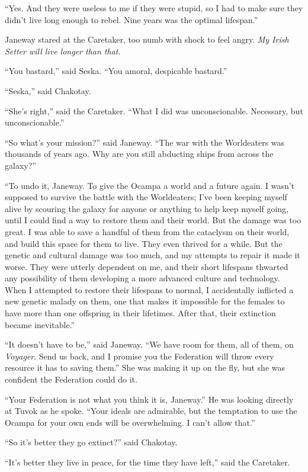 \documentclass[twoside,letterpaper,12pt]{memoir}
\begin{document}
``Yes. And they were useless to me if they were stupid, so I had to make sure they didn’t live long enough to rebel. Nine years was the optimal lifespan.” 

Janeway stared at the Caretaker, too numb with shock to feel angry. \textit{My Irish Setter will live longer than that}. 

``You bastard,” said Seska. ``You amoral, despicable bastard.” 

``Seska,” said Chakotay. 

``She’s right,” said the Caretaker. ``What I did was unconscionable. Necessary, but unconscionable.” 

``So what’s your mission?” said Janeway. ``The war with the Worldeaters was thousands of years ago. Why are you still abducting ships from across the galaxy?” 

``To undo it, Janeway. To give the Ocampa a world and a future again. I wasn’t supposed to survive the battle with the Worldeaters; I’ve been keeping myself alive by scouring the galaxy for anyone or anything to help keep myself going, until I could find a way to restore them and their world. But the damage was too great. I was able to save a handful of them from the cataclysm on their world, and build this space for them to live. They even thrived for a while. But the genetic and cultural damage was too much, and my attempts to repair it made it worse. They were utterly dependent on me, and their short lifespans thwarted any possibility of them developing a more advanced culture and technology. When I attempted to restore their lifespans to normal, I accidentally inflicted a new genetic malady on them, one that makes it impossible for the females to have more than one offspring in their lifetimes. After that, their extinction became inevitable.” 

``It doesn’t have to be,” said Janeway. ``We have room for them, all of them, on \textit{Voyager}. Send us back, and I promise you the Federation will throw every resource it has to saving them.” She was making it up on the fly, but she was confident the Federation could do it. 

``Your Federation is not what you think it is, Janeway.” He was looking directly at Tuvok as he spoke. ``Your ideals are admirable, but the temptation to use the Ocampa for your own ends will be overwhelming. I can’t allow that.” 

``So it’s better they go extinct?” said Chakotay. 

``It’s better they live in peace, for the time they have left,” said the Caretaker. 
\end{document}

